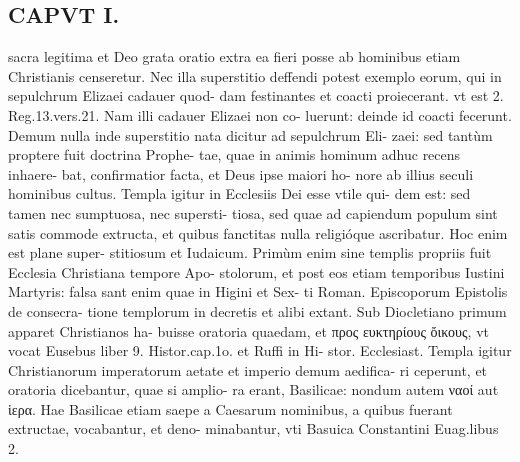 \documentclass{article}
\begin{document}
\begin{pages}
\section*{CAPVT I. }
\marginpar{[ p.71 ]}\pstart sacra legitima et Deo grata oratio extra ea fieri posse ab hominibus etiam Christianis censeretur.  \pend\pstart Nec illa superstitio deffendi potest exemplo eorum, qui in sepulchrum Elizaei cadauer quod- dam festinantes et coacti proiecerant. vt est 2. Reg.13.vers.21. Nam illi cadauer Elizaei non co- luerunt: deinde id coacti fecerunt. Demum nulla inde superstitio nata dicitur ad sepulchrum Eli- zaei: sed tantùm proptere fuit doctrina Prophe- tae, quae in animis hominum adhuc recens inhaere- bat, confirmatior facta, et Deus ipse maiori ho- nore ab illius seculi hominibus cultus.  \pend\pstart Templa igitur in Ecclesiis Dei esse vtile qui- dem est: sed tamen nec sumptuosa, nec supersti- tiosa, sed quae ad capiendum populum sint satis commode extructa, et quibus fanctitas nulla religióque ascribatur. Hoc enim est plane super- stitiosum et Iudaicum. Primùm enim sine templis propriis fuit Ecclesia Christiana tempore Apo- stolorum, et post eos etiam temporibus Iustini Martyris: falsa sant enim quae in Higini et Sex- ti Roman. Episcoporum Epistolis de consecra- tione templorum in decretis et alibi extant. Sub Diocletiano primum apparet Christianos ha- buisse oratoria quaedam, et προς ευκτηρίους  ὄικους, vt vocat Eusebus liber 9. Histor.cap.1o. et Ruffi in Hi- stor. Ecclesiast. Templa igitur Christianorum imperatorum aetate et imperio demum aedifica- ri ceperunt, et oratoria dicebantur, quae si amplio- ra erant, Basilicae: nondum autem ναοί aut ἱερα. Hae Basilicae etiam saepe a Caesarum nominibus, a quibus fuerant extructae, vocabantur, et deno- minabantur, vti Basuica Constantini Euag.libus 2.  \pend

\end{pages}
\end{document}
